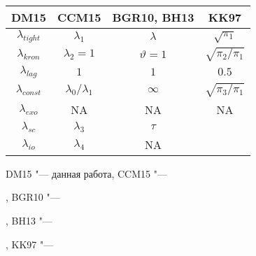 \documentclass[11pt]{article} %
\newcommand{\eng}[1]{\begin{otherlanguage}{english}#1\end{otherlanguage}}
\begin{document}
\begin{center}
\begin{tabular}{cccc}
\toprule
DM15 &  CCM15 &  BGR10, BH13 & KK97  \\
\midrule
$\lambda_{tight}$ & $\lambda_1$ & $\lambda$ & $\sqrt{\pi_1}$ \\
$\lambda_{kron}$ & $\lambda_2=1$ & $\vartheta=1$ &  $\sqrt{\pi_2/\pi_1}$\\
$\lambda_{lag}$ & $1$ & $1$ & $0.5$\\
$\lambda_{const}$  & $\lambda_0/\lambda_1$ & $\infty$ &$ \sqrt{\pi_3/\pi_1}$\\
$\lambda_{exo}$ & NA & NA & NA\\
\midrule
$\lambda_{sc}$ & $\lambda_3$ & $\tau$ & \\
$\lambda_{io}$ & $\lambda_4$ & NA & \\
\bottomrule
\end{tabular}
\end{center}


DM15 "--- данная работа, CCM15 "--- \eng{\cite{carriero_al_2015}}, BGR10 "--- \eng{\cite{banbura_al_2010}},
BH13 "--- \eng{\cite{berg_henzel_2013}}, KK97 "--- \eng{\cite{kadiyala_karlsson_1997}}
\end{document}

